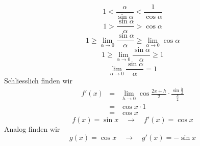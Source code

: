\documentclass{report}
\begin{document}
\begin{equation*}1 < \frac{\alpha}{\sin \alpha} < \frac{1}{\cos \alpha}\end{equation*}
\begin{equation*}1 > \frac{\sin \alpha}{\alpha} > \cos \alpha\end{equation*}
\begin{equation*}1 \geq \lim_{\alpha \to 0} \frac{\sin \alpha}{\alpha} \geq \lim_{\alpha \to 0} \cos \alpha\end{equation*}
\begin{equation*}1 \geq \lim_{\alpha \to 0} \frac{\sin \alpha}{\alpha} \geq 1\end{equation*}
\begin{equation*}\boxed{\lim_{\alpha \to 0} \frac{\sin \alpha}{\alpha} = 1}\end{equation*}
Schliesslich finden wir
\begin{eqnarray}f'(x) & = & \lim_{h \to 0} \cos \frac{2x+h}{2} \cdot \frac{\sin \frac{h}{2}}{\frac{h}{2}} \nonumber \\
& = & \cos x \cdot 1 \nonumber \\
& = & \cos x\end{eqnarray}
\begin{equation*}\boxed{f(x) = \sin x \quad \to \quad f'(x) = \cos x}\end{equation*}
Analog finden wir
\begin{equation*}\boxed{g(x) = \cos x \quad \to \quad g'(x) = -\sin x}\end{equation*}
\end{document}
